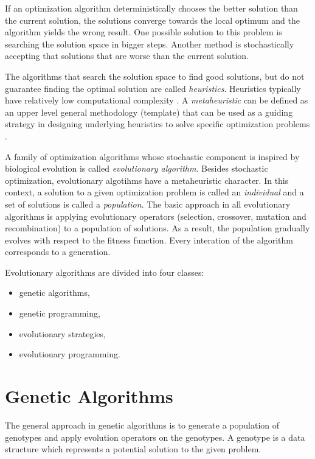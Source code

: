 If an optimization algorithm deterministically chooses the better solution than the current solution, the solutions converge towards the local optimum and the algorithm yields the wrong result.
One possible solution to this problem is searching the solution space in bigger steps.
Another method is stochastically accepting that solutions that are worse than the current solution.

The algorithms that search the solution space to find good solutions, but do not guarantee finding the optimal solution are called \textit{heuristics}. 
Heuristics typically have relatively low computational complexity \cite{cupic2013prirodom}.
A \textit{metaheuristic} can be defined as an upper level general methodology (template) that can be used as a guiding strategy in designing underlying heuristics to solve specific optimization problems \cite{talbi2009metaheuristics}.

A family of optimization algorithms whose stochastic component is inspired by biological evolution is called \textit{evolutionary algorithm}.
Besides stochastic optimization, evolutionary algotihms have a metaheuristic character.
In this context, a solution to a given optimization problem is called an \textit{individual} and a set of solutions is called a \textit{population}.
The basic approach in all evolutionary algorithms is applying evolutionary operators (selection, crossover, mutation and recombination) to a population of solutions.
As a result, the population gradually evolves with respect to the fitness function.
Every interation of the algorithm corresponds to a generation.

Evolutionary algorithms are divided into four classes: 
\begin{itemize}
	\item genetic algorithms,
	\item genetic programming,
	\item evolutionary strategies,
	\item evolutionary programming.
\end{itemize}

\section{Genetic Algorithms}
The general approach in genetic algorithms is to generate a population of genotypes and apply evolution operators on the genotypes.
A genotype is a data structure which represents a potential solution to the given problem.

